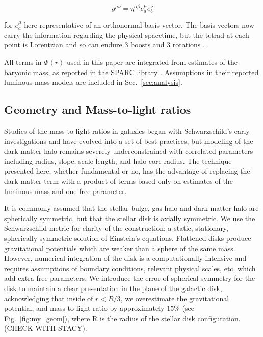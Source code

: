\documentclass[reprint,%
 amsmath,amssymb,
 aps,
]{revtex4-1}
\begin{document}
\begin{equation}
    g^{\mu \nu} = \eta^{\alpha \beta} e^\mu_a  e^\nu_b
\end{equation} 

for $e^\mu_a$ here representative of an orthonormal basis vector. The basis vectors now carry the information regarding the physical spacetime, but the tetrad at each point is Lorentzian and so can endure 3 boosts and 3 rotations \cite{BertschingerClassTetrads}. 


   All terms in $\Phi(r)$ used in this paper  are    integrated from estimates of the baryonic mass, as reported in the      SPARC  library \cite{2016Lelli}.  
   Assumptions in their reported luminous mass models  are included in Sec.~\ref{sec:analysis}. 
\subsection{Geometry and Mass-to-light ratios}

Studies of the mass-to-light ratios in galaxies began with Schwarzschild's early investigations \cite{1954AJ.....59..273S} and have evolved into a set of best practices, but modeling of the 
dark matter halo remains severely   underconstrained with correlated parameters including radius, slope, scale length, and halo core radius.     
The technique presented here, whether fundamental or no,  has the advantage of replacing the dark matter term  with a product of terms based only on estimates of the luminous mass and   one free parameter.


It is commonly assumed that   the stellar bulge, gas halo and   dark matter halo are spherically symmetric, but that the stellar disk is axially symmetric. We use 
the Schwarzschild metric   for clarity of the construction;  a static, stationary, spherically symmetric solution of Einstein's equations.
Flattened disks produce gravitational potentials which are weaker than a sphere of the same mass\cite{Chatterjee}. However, numerical integration of the disk is a computationally intensive and requires assumptions of  boundary conditions,   relevant physical scales,  etc. which add extra free-parameters\cite{2011A&A...531A..36H}. We 
  introduce the error of spherical symmetry   for the disk to maintain a clear presentation in the plane of the galactic disk, acknowledging  that inside of $r< R/3$, we   overestimate the gravitational potential, and  mass-to-light ratio by approximately $15\%$ (see Fig.~\ref{fig:my_geom}),  where R is the radius of the stellar disk configuration.  (CHECK WITH STACY). 
\end{document}

